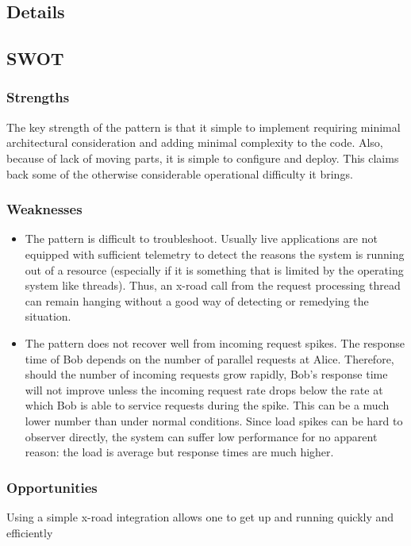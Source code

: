 \documentclass[10pt,a4paper]{article}
\begin{document}
\subsection{Details}

\subsection{SWOT}
\subsubsection{Strengths}
The key strength of the pattern is that it simple to implement requiring minimal architectural consideration and adding minimal complexity to the code. Also, because of lack of moving parts, it is simple to configure and deploy. This claims back some of the otherwise considerable operational difficulty it brings.

\subsubsection{Weaknesses}
\begin{itemize}
	\item The pattern is difficult to troubleshoot. Usually live applications are not equipped with sufficient telemetry to detect the reasons the system is running out of a resource (especially if it is something that is limited by the operating system like threads). Thus, an x-road call from the request processing thread can remain hanging without a good way of detecting or remedying the situation.
	\item The pattern does not recover well from incoming request spikes. The response time of Bob depends on the number of parallel requests at Alice. Therefore, should the number of incoming requests grow rapidly, Bob's response time will not improve unless the incoming request rate drops below the rate at which Bob is able to service requests during the spike. This can be a much lower number than under normal conditions. Since load spikes can be hard to observer directly, the system can suffer low performance for no apparent reason: the load is average but response times are much higher. 
\end{itemize}
	
\subsubsection{Opportunities}
Using a simple x-road integration allows one to get up and running quickly and efficiently
\end{document}
